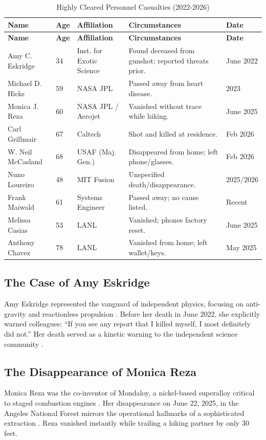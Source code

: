 \documentclass[11pt,a4paper]{article}
\begin{document}
\begin{longtable}{p{2.5cm} p{0.5cm} p{3cm} p{4.5cm} p{2cm}}
\caption{Highly Cleared Personnel Casualties (2022-2026)} \\
\toprule 
\textbf{Name} & \textbf{Age} & \textbf{Affiliation} & \textbf{Circumstances} & \textbf{Date} \\
\midrule
\endfirsthead
\toprule
\textbf{Name} & \textbf{Age} & \textbf{Affiliation} & \textbf{Circumstances} & \textbf{Date} \\
\midrule
\endhead 
Amy C. Eskridge \cite{SC-1} & 34 & Inst. for Exotic Science & Found deceased from gunshot; reported threats prior. & June 2022 \\
\midrule
Michael D. Hicks \cite{SC-6} & 59 & NASA JPL & Passed away from heart disease. & 2023 \\
\midrule
Monica J. Reza \cite{SC-2} & 60 & NASA JPL / Aerojet & Vanished without trace while hiking. & June 2025 \\
\midrule
Carl Grillmair \cite{SC-4} & 67 & Caltech & Shot and killed at residence. & Feb 2026 \\
\midrule
W. Neil McCasland \cite{SC-3} & 68 & USAF (Maj. Gen.) & Disappeared from home; left phone/glasses. & Feb 2026 \\
\midrule
Nuno Loureiro \cite{SC-5} & 48 & MIT Fusion & Unspecified death/disappearance. & 2025/2026 \\
\midrule
Frank Maiwald \cite{SC-7} & 61 & Systems Engineer & Passed away; no cause listed. & Recent \\
\midrule
Melissa Casias \cite{SC-9} & 53 & LANL & Vanished; phones factory reset. & June 2025 \\
\midrule
Anthony Chavez \cite{SC-8} & 78 & LANL & Vanished from home; left wallet/keys. & May 2025 \\
\bottomrule
\end{longtable}

\subsection{The Case of Amy Eskridge}\label{sec:eskridge}
Amy Eskridge represented the vanguard of independent physics, focusing on anti-gravity and reactionless propulsion \cite{SC-1}. Before her death in June 2022, she explicitly warned colleagues: ``If you see any report that I killed myself, I most definitely did not.'' Her death served as a kinetic warning to the independent science community \cite{SC-1}.

\subsection{The Disappearance of Monica Reza}\label{sec:reza}
Monica Reza was the co-inventor of Mondaloy, a nickel-based superalloy critical to staged combustion engines \cite{SC-2}. Her disappearance on June 22, 2025, in the Angeles National Forest mirrors the operational hallmarks of a sophisticated extraction \cite{SC-2}. Reza vanished instantly while trailing a hiking partner by only 30 feet.
\end{document}
